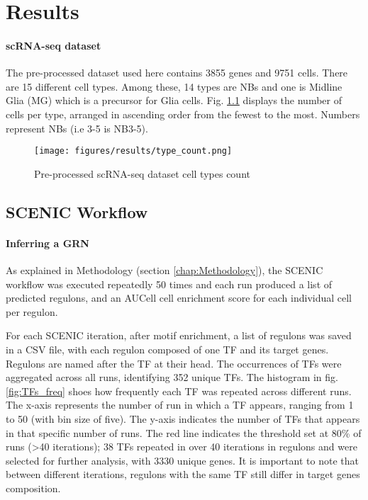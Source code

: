 \chapter{Results}\label{chap:results}
\subsubsection{scRNA-seq dataset}
The pre-processed dataset used here contains 3855 genes and 9751 cells. There are 15 different cell types. 
Among these, 14 types are NBs and one is Midline Glia (MG) which is a precursor for Glia cells. 
Fig. \ref{fig:type_count} displays the number of cells per type, arranged in ascending order from the fewest to the most. 
Numbers represent NBs (i.e 3-5 is NB3-5). 

\begin{figure}[ht]
    \centering
    \texttt{[image: figures/results/type\_count.png]}
    \caption{Pre-processed scRNA-seq dataset cell types count}
    \label{fig:type_count}
\end{figure}

\section{SCENIC Workflow}
\subsubsection{Inferring a GRN}
As explained in Methodology (section \ref{chap:Methodology}), 
the SCENIC workflow was executed repeatedly 50 times and each run produced a list of predicted regulons, 
and an AUCell cell enrichment score for each individual cell per regulon. 

For each SCENIC iteration, after motif enrichment, 
a list of regulons was saved in a CSV file, with each regulon composed of one TF and its target genes. 
Regulons are named after the TF at their head. 
The occurrences of TFs were aggregated across all runs, identifying 352 unique TFs. 
The histogram in fig. \ref{fig:TFs_freq} shoes how frequently each TF was repeated across different runs. 
The x-axis represents the number of run in which a TF appears, ranging from 1 to 50 (with bin size of five). 
The y-axis indicates the number of TFs that appears in that specific number of runs. 
The red line indicates the threshold set at 80\% of runs (>40 iterations); 
38 TFs repeated in over 40 iterations in regulons and were selected for further analysis, with 3330 unique genes.
It is important to note that between different iterations, regulons with the same TF still differ in target genes composition. 

